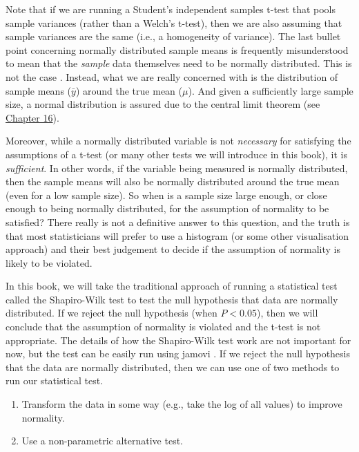 \documentclass[
  openany]{krantz}
\providecommand{\tightlist}{%
  \setlength{\itemsep}{0pt}\setlength{\parskip}{0pt}}
\begin{document}
Note that if we are running a Student's independent samples t-test that pools sample variances (rather than a Welch's t-test), then we are also assuming that sample variances are the same (i.e., a homogeneity of variance).
The last bullet point concerning normally distributed sample means is frequently misunderstood to mean that the \emph{sample} data themselves need to be normally distributed.
This is not the case \citep{Johnson1995, Lumley2002}.
Instead, what we are really concerned with is the distribution of sample means (\(\bar{y}\)) around the true mean (\(\mu\)).
And given a sufficiently large sample size, a normal distribution is assured due to the central limit theorem (see \protect\hyperlink{Chapter_16}{Chapter 16}).

Moreover, while a normally distributed variable is not \emph{necessary} for satisfying the assumptions of a t-test (or many other tests we will introduce in this book), it is \emph{sufficient}.
In other words, if the variable being measured is normally distributed, then the sample means will also be normally distributed around the true mean (even for a low sample size).
So when is a sample size large enough, or close enough to being normally distributed, for the assumption of normality to be satisfied?
There really is not a definitive answer to this question, and the truth is that most statisticians will prefer to use a histogram (or some other visualisation approach) and their best judgement to decide if the assumption of normality is likely to be violated.

In this book, we will take the traditional approach of running a statistical test called the Shapiro-Wilk test to test the null hypothesis that data are normally distributed.
If we reject the null hypothesis (when \(P < 0.05\)), then we will conclude that the assumption of normality is violated and the t-test is not appropriate.
The details of how the Shapiro-Wilk test work are not important for now, but the test can be easily run using jamovi \citep{Jamovi2022}.
If we reject the null hypothesis that the data are normally distributed, then we can use one of two methods to run our statistical test.

\begin{enumerate}
\def\labelenumi{\arabic{enumi}.}
\tightlist
\item
  Transform the data in some way (e.g., take the log of all values) to improve normality.
\item
  Use a non-parametric alternative test.
\end{enumerate}
\end{document}
